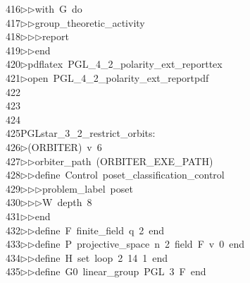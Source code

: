 \begin{tabbing}
416\>$\triangleright$\>$\triangleright$\>with\ G\ do\ \\[0pt]
417\>$\triangleright$\>$\triangleright$\>group\_theoretic\_activity\ \\[0pt]
418\>$\triangleright$\>$\triangleright$\>$\triangleright$\>report\ \\[0pt]
419\>$\triangleright$\>$\triangleright$\>end\\[0pt]
420\>$\triangleright$\>pdflatex\ PGL\_4\_2\_polarity\_ext\_reporttex\\[0pt]
421\>$\triangleright$\>open\ PGL\_4\_2\_polarity\_ext\_reportpdf\\[0pt]
422\>\\[0pt]
423\>\\[0pt]
424\>\\[0pt]
425\>PGLstar\_3\_2\_restrict\_orbits:\\[0pt]
426\>$\triangleright$\>(ORBITER)\ v\ 6\ \\[0pt]
427\>$\triangleright$\>$\triangleright$\>orbiter\_path\ (ORBITER\_EXE\_PATH)\ \\[0pt]
428\>$\triangleright$\>$\triangleright$\>define\ Control\ poset\_classification\_control\ \\[0pt]
429\>$\triangleright$\>$\triangleright$\>$\triangleright$\>problem\_label\ poset\ \\[0pt]
430\>$\triangleright$\>$\triangleright$\>$\triangleright$\>W\ depth\ 8\ \\[0pt]
431\>$\triangleright$\>$\triangleright$\>end\ \\[0pt]
432\>$\triangleright$\>$\triangleright$\>define\ F\ finite\_field\ q\ 2\ end\ \\[0pt]
433\>$\triangleright$\>$\triangleright$\>define\ P\ projective\_space\ n\ 2\ field\ F\ v\ 0\ end\ \\[0pt]
434\>$\triangleright$\>$\triangleright$\>define\ H\ set\ loop\ 2\ 14\ 1\ end\ \\[0pt]
435\>$\triangleright$\>$\triangleright$\>define\ G0\ linear\_group\ PGL\ 3\ F\ end\ \\[0pt]

\end{tabbing}
